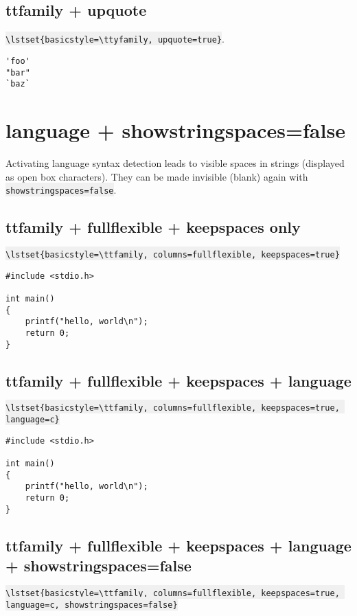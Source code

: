 \documentclass{article}
\newcommand{\bs}{\textbackslash}
\newcommand{\ttt}[1]{\colorbox[HTML]{f0f0f0}{\texttt{#1}}}
\begin{document}
\subsection{ttfamily + upquote}
\ttt{\bs{}lstset\{basicstyle=\bs{}ttyfamily, upquote=true\}}.

{
\lstset{basicstyle=\ttfamily, upquote=true}
\begin{lstlisting}
'foo'
"bar"
`baz`
\end{lstlisting}
}

\pagebreak


\section{language + showstringspaces=false}
Activating language syntax detection leads to visible spaces in strings
(displayed as open box characters). They can be made invisible (blank)
again with \ttt{showstringspaces=false}.

\subsection{ttfamily + fullflexible + keepspaces only}
{
\small
\ttt{\bs{}lstset\{basicstyle=\bs{}ttfamily, columns=fullflexible,
                     keepspaces=true\}}
}

{
\lstset{
    basicstyle=\ttfamily,
    columns=fullflexible,
    keepspaces=true,
}
\begin{lstlisting}
#include <stdio.h>

int main()
{
    printf("hello, world\n");
    return 0;
}
\end{lstlisting}
}

\subsection{ttfamily + fullflexible + keepspaces + language}
{
\small
\ttt{\bs{}lstset\{basicstyle=\bs{}ttfamily, columns=fullflexible,
                     keepspaces=true, language=c\}}
}

{
\lstset{
    basicstyle=\ttfamily,
    columns=fullflexible,
    keepspaces=true,
    language=c,
}
\begin{lstlisting}
#include <stdio.h>

int main()
{
    printf("hello, world\n");
    return 0;
}
\end{lstlisting}
}

\subsection{ttfamily + fullflexible + keepspaces + language +
            showstringspaces=false}
{
\small
\ttt{\bs{}lstset\{basicstyle=\bs{}ttfamily, columns=fullflexible,
                     keepspaces=true, language=c, showstringspaces=false\}}
}
\end{document}
